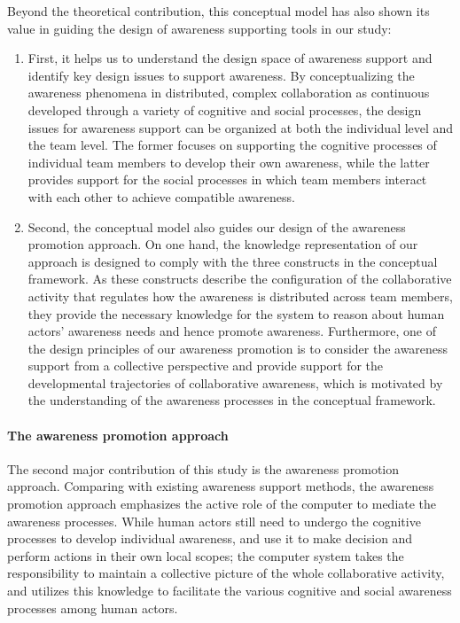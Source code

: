 Beyond the theoretical contribution, this conceptual model has also shown its value in guiding the design of awareness supporting tools in our study:

\begin{enumerate}
	\item First, it helps us to understand the design space of awareness support and identify key design issues to support awareness. By conceptualizing the awareness phenomena in distributed, complex collaboration as continuous developed through a variety of cognitive and social processes, the design issues for awareness support can be organized at both the individual level and the team level. The former focuses on supporting the cognitive processes of individual team members to develop their own awareness, while the latter provides support for the social processes in which team members interact with each other to achieve compatible awareness.
	\item Second, the conceptual model also guides our design of the awareness promotion approach. On one hand, the knowledge representation of our approach is designed to comply with the three constructs in the conceptual framework. As these constructs describe the configuration of the collaborative activity that regulates how the awareness is distributed across team members, they provide the necessary knowledge for the system to reason about human actors' awareness needs and hence promote awareness. Furthermore, one of the design principles of our awareness promotion is to consider the awareness support from a collective perspective and provide support for the developmental trajectories of collaborative awareness, which is motivated by the understanding of the awareness processes in the conceptual framework.
\end{enumerate}

\paragraph*{The awareness promotion approach} %
\label{par:the_awareness_promotion_approach}
The second major contribution of this study is the awareness promotion approach. Comparing with existing awareness support methods, the awareness promotion approach emphasizes the active role of the computer to mediate the awareness processes. While human actors still need to undergo the cognitive processes to develop individual awareness, and use it to make decision and perform actions in their own local scopes; the computer system takes the responsibility to maintain a collective picture of the whole collaborative activity, and utilizes this knowledge to facilitate the various cognitive and social awareness processes among human actors. 

